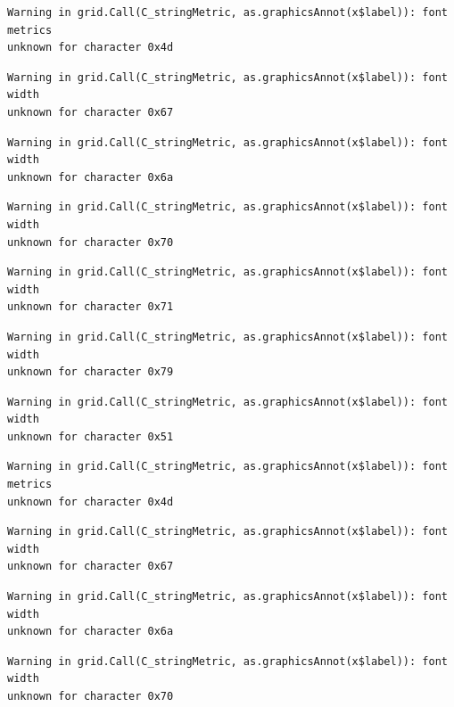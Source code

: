 \documentclass[
  letterpaper,
  DIV=11,
  numbers=noendperiod]{scrreprt}
\begin{document}
\begin{verbatim}
Warning in grid.Call(C_stringMetric, as.graphicsAnnot(x$label)): font metrics
unknown for character 0x4d
\end{verbatim}

\begin{verbatim}
Warning in grid.Call(C_stringMetric, as.graphicsAnnot(x$label)): font width
unknown for character 0x67
\end{verbatim}

\begin{verbatim}
Warning in grid.Call(C_stringMetric, as.graphicsAnnot(x$label)): font width
unknown for character 0x6a
\end{verbatim}

\begin{verbatim}
Warning in grid.Call(C_stringMetric, as.graphicsAnnot(x$label)): font width
unknown for character 0x70
\end{verbatim}

\begin{verbatim}
Warning in grid.Call(C_stringMetric, as.graphicsAnnot(x$label)): font width
unknown for character 0x71
\end{verbatim}

\begin{verbatim}
Warning in grid.Call(C_stringMetric, as.graphicsAnnot(x$label)): font width
unknown for character 0x79
\end{verbatim}

\begin{verbatim}
Warning in grid.Call(C_stringMetric, as.graphicsAnnot(x$label)): font width
unknown for character 0x51
\end{verbatim}

\begin{verbatim}
Warning in grid.Call(C_stringMetric, as.graphicsAnnot(x$label)): font metrics
unknown for character 0x4d
\end{verbatim}

\begin{verbatim}
Warning in grid.Call(C_stringMetric, as.graphicsAnnot(x$label)): font width
unknown for character 0x67
\end{verbatim}

\begin{verbatim}
Warning in grid.Call(C_stringMetric, as.graphicsAnnot(x$label)): font width
unknown for character 0x6a
\end{verbatim}

\begin{verbatim}
Warning in grid.Call(C_stringMetric, as.graphicsAnnot(x$label)): font width
unknown for character 0x70
\end{verbatim}
\end{document}

